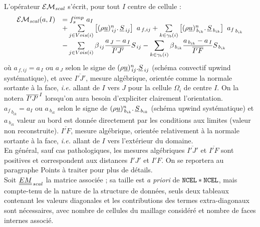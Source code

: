 L'opérateur $\mathcal{EM_{\it{scal}}}$ s'écrit, pour tout $I$ centre de cellule :
\begin{equation}
\begin{array}{lll}
\mathcal{EM_{\it{scal}}}(a,I) &=  f_s^{imp}\ a_I \\
&+\sum\limits_{j\in Vois(i)}\left[{(\rho \underline{u})_{\,ij}^n} \text{.}\, \underline{S}_{\,ij}\right]\ a_{\,f,ij}
+\sum\limits_{k\in {\gamma_b(i)}} \left[{(\rho \underline{u})_{\,{b}_{ik}}^n}
\text{.}\, \underline{S}_{\,{b}_{ik}}\right]\ {a_f}_{\,{b}_{ik}} \\
&-\sum\limits_{j\in Vois(i)} \beta_{\,ij}\displaystyle
\frac{a_{\,J}- a_{\,I}}{\overline{I'J'}} S_{\,ij}
-\sum\limits_{k\in {\gamma_b(i)}} \beta_{\,b_{ik}}\displaystyle
\frac{a_{\,b_{ik}}-a_{\,I}}{\overline{I'F}} S_{\,b_{ik}} \\
\end{array}
\end{equation}
où
$a_{\,f,ij} = a_{\,I} \text{ ou }  a_{\,J}$
selon le signe de $(\rho \underline{u})_{\,ij}^n.\underline{S}_{\,ij}$ (schéma
convectif upwind systématique),
et avec $\overline{I'J'}$, mesure algébrique, orientée comme la
normale sortante à la face, {\it i.e.} allant de $I$ vers $J$ pour la cellule
$\Omega_i$ de centre $I$. On la
notera ${\overline{I'J'}^{\tiny {\,I}}}$ lorsqu'on aura besoin d'expliciter
clairement l'orientation.\\
${a_f}_{\,{b}_{ik}} = a_I \text{ ou  }
a_{\ {b}_{ik}}$ selon le signe de
${(\rho \underline{u})_{\,{b}_{ik}}^n}\text{.}\, \underline{S}_{\,{b}_{ik}}$ (schéma
upwind systématique)
et $a_{\ {b}_{ik}}$ valeur au bord est donnée directement par les conditions
aux limites (valeur non reconstruite). $\overline{I'F}$, mesure algébrique, orientée relativement à la
normale sortante à la face, {\it i.e.} allant de $I$ vers l'extérieur du domaine.\\
En général, sauf cas pathologiques, les mesures algébriques
$\overline{I'J'}$ et $\overline{I'F}$
sont positives et correspondent aux distances $I'J'$ et $I'F$. On se reportera
au paragraphe Points à traiter pour plus de détails.\\
Soit ${\underline{\underline{EM}}}_{\,scal}$ la matrice associée ; sa taille est {\it a priori} de
$\text{\texttt{NCEL}} * \text{\texttt{NCEL}}$, mais compte-tenu de la nature de la structure de
données, seuls deux tableaux  contenant les valeurs
diagonales et  les contributions des termes extra-diagonaux sont nécessaires, avec  nombre de
cellules du maillage considéré et  nombre de faces internes associé.\\

